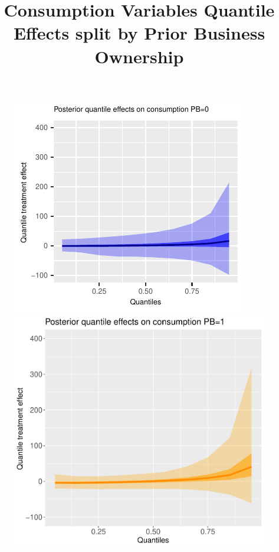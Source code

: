 \documentclass[english,12pt]{article}\usepackage{lmodern}
\numberwithin{equation}{section}
\begin{document}
 \begin{figure}[h!]
  \centering
  \title{Consumption Variables Quantile Effects split by Prior Business Ownership}
    \includegraphics[scale=0.4]{posterior_parent_quantile_TEs_consumption_pb_0_lognormal.pdf}
    \includegraphics[scale=0.4]{posterior_parent_quantile_TEs_consumption_pb_1_lognormal.pdf}\\

\end{figure}
\end{document}
